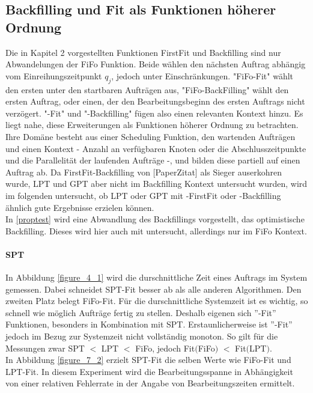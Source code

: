 \FloatBarrier
\subsection{Backfilling und Fit als Funktionen höherer Ordnung}
\label{chap:higher-order}

Die in Kapitel 2 vorgestellten Funktionen FirstFit und Backfilling sind nur Abwandelungen der FiFo Funktion. Beide wählen den nächsten Auftrag abhängig vom Einreihungszeitpunkt $q_j$, jedoch unter Einschränkungen. "FiFo-Fit" wählt den ersten unter den startbaren Aufträgen aus, "FiFo-BackFilling" wählt den ersten Auftrag, oder einen, der den Bearbeitungsbeginn des ersten Auftrags nicht verzögert. "-Fit" und "-Backfilling" fügen also einen relevanten Kontext hinzu. Es liegt nahe, diese Erweiterungen als Funktionen höherer Ordnung zu betrachten. Ihre Domäne besteht aus einer Scheduling Funktion, den wartenden Aufträgen und einen Kontext - Anzahl an verfügbaren Knoten oder die Abschlusszeitpunkte und die Parallelität der laufenden Aufträge -, und bilden diese partiell auf einen Auftrag ab. 
Da FirstFit-Backfilling von [PaperZitat] als Sieger auserkohren wurde, LPT und GPT aber nicht im Backfilling Kontext untersucht wurden, wird im folgenden untersucht, ob LPT oder GPT mit -FirstFit oder -Backfilling ähnlich gute Ergebnisse erzielen können.\\
In \ref{proptest} wird eine Abwandlung des Backfillings vorgestellt, das optimistische Backfilling. Dieses wird hier auch mit untersucht, allerdings nur im FiFo Kontext.

\paragraph{SPT}
In Abbildung \ref{figure_4_1} wird die durschnittliche Zeit eines Auftrags im System gemessen. Dabei schneidet SPT-Fit besser ab als alle anderen Algorithmen. Den zweiten Platz belegt FiFo-Fit. Für die durschnittliche Systemzeit ist es wichtig, so schnell wie möglich Aufträge fertig zu stellen. Deshalb eigenen sich ''-Fit'' Funktionen, besonders in Kombination mit SPT. Erstaunlicherweise ist ''-Fit'' jedoch im Bezug zur Systemzeit nicht vollständig monoton. So gilt für die Messungen zwar SPT $<$ LPT $<$ FiFo, jedoch Fit$($FiFo$)$ $<$ Fit$($LPT$)$.\\
In Abbildung \ref{figure_7_2} erzielt SPT-Fit die selben Werte wie FiFo-Fit und LPT-Fit. In diesem Experiment wird die Bearbeitungsspanne in Abhängigkeit von einer relativen Fehlerrate in der Angabe von Bearbeitungszeiten ermittelt.\\


